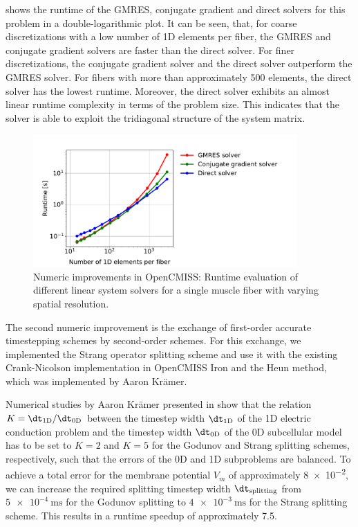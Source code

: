  shows the runtime of the GMRES, conjugate gradient and direct solvers for this problem in a double-logarithmic plot.
It can be seen, that, for coarse discretizations with a low number of 1D elements per fiber, the GMRES and conjugate gradient solvers are faster than the direct solver. For finer discretizations, the conjugate gradient solver and the direct solver outperform the GMRES solver. For fibers with more than approximately 500 elements, the direct solver has the lowest runtime. Moreover, the direct solver exhibits an almost linear runtime complexity in terms of the problem size. This indicates that the solver is able to exploit the tridiagonal structure of the system matrix.

\begin{figure}
  \centering%
  \includegraphics[width=0.9\textwidth]{images/results/studies/opencmiss_linear_solvers.pdf}%
  \caption{Numeric improvements in OpenCMISS: Runtime evaluation of different linear system solvers for a single muscle fiber with varying spatial resolution.}%
  \label{fig:opencmiss_linear_solvers}%
\end{figure}%

The second numeric improvement is the exchange of first-order accurate timestepping schemes by second-order schemes. For this exchange, we implemented the Strang operator splitting scheme and use it with the existing Crank-Nicolson implementation in OpenCMISS Iron and the Heun method, which was  implemented by Aaron Krämer.

Numerical studies by Aaron Krämer presented in \cite{Bradley:2018:EDB} show that the relation $K=\dt_\text{1D}/\dt_\text{0D}$ between the timestep width $\dt_\text{1D}$ of the 1D electric conduction problem and the timestep width $\dt_\text{0D}$ of the 0D subcellular model has to be set to $K=2$ and $K=5$ for the Godunov and Strang splitting schemes, respectively, such that the errors of the 0D and 1D subproblems are balanced. To achieve a total error for the membrane potential $V_m$ of approximately \num{8e-2}, we can increase the required splitting timestep width $\dt_\text{splitting}$ from $\SI{5e-4}{\ms}$ for the Godunov splitting to $\SI{4e-3}{\ms}$ for the Strang splitting scheme. This results in a runtime speedup  of approximately 7.5.

